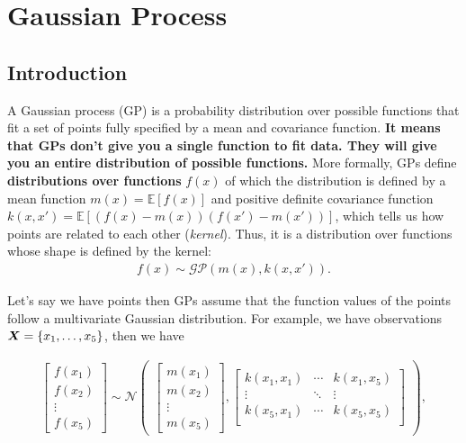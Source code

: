 \chapter{Gaussian Process}

\section{Introduction}
\label{sec:gaussian_process}
A Gaussian process (GP) is a probability distribution over possible functions that fit a set of points fully specified by a mean and covariance function. \textbf{It means that GPs don't give you a single function to fit data. They will give you an entire distribution of possible functions.} More formally, GPs define \textbf{distributions over functions} $f(x)$ of which the distribution is defined by a mean function $m(x)=\mathbb{E}[f(x)]$ and positive definite covariance function $k(x,x')=\mathbb{E}[(f(x)-m(x))(f(x')-m(x'))]$, which tells us how points are related to each other (\ie \textit{kernel}). Thus, it is a distribution over functions whose shape is defined by the kernel:
\begin{align*}
	f(x) \sim \mathcal{GP}(m(x),k(x,x')).
\end{align*}

Let's say we have points then GPs assume that the function values of the points follow a multivariate Gaussian distribution. For example, we have observations ${\bm{X}}=\{x_1, \dots, x_5\}$, then we have

\begin{align*}
	\begin{bmatrix}
		f(x_1)\\
		f(x_2)\\
		\vdots \\
		f(x_5)
	\end{bmatrix}\sim \mathcal{N}
	\begin{pmatrix}
	\begin{bmatrix}
		m(x_1)\\
		m(x_2)\\
		\vdots\\
		m(x_5)
	\end{bmatrix},
	\begin{bmatrix}
		k(x_1,x_1)& \cdots& k(x_1,x_5)\\
		\vdots& \ddots& \vdots\\
		k(x_5,x_1)& \cdots& k(x_5,x_5)\\
	\end{bmatrix}
	\end{pmatrix},
\end{align*}

